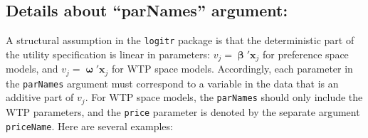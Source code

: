 \documentclass[article]{jss}
\begin{document}
\hypertarget{details-about-parnames-argument}{%
\subsection{Details about ``parNames''
argument:}\label{details-about-parnames-argument}}

A structural assumption in the \texttt{logitr} package is that the
deterministic part of the utility specification is linear in parameters:
\(v_{j} = \boldsymbol\upbeta' \mathrm{\mathbf{x}}_{j}\) for preference
space models, and
\(v_{j} = \boldsymbol\upomega' \mathrm{\mathbf{x}}_{j}\) for WTP space
models. Accordingly, each parameter in the \texttt{parNames} argument
must correspond to a variable in the data that is an additive part of
\(v_{j}\). For WTP space models, the \texttt{parNames} should only
include the WTP parameters, and the \texttt{price} parameter is denoted
by the separate argument \texttt{priceName}. Here are several examples:
\end{document}
